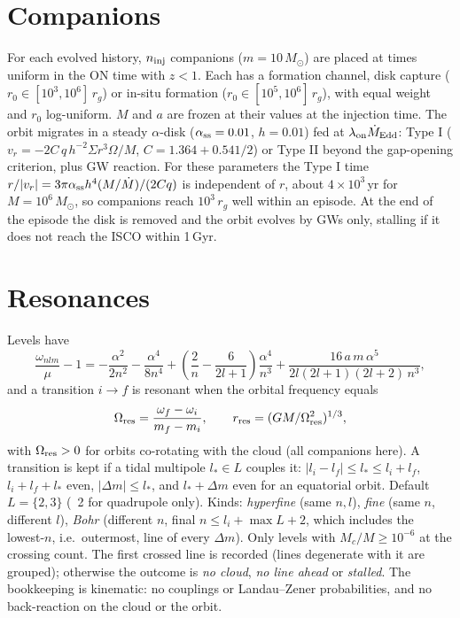 \documentclass[11pt]{article}
\newcommand{\code}[1]{\path{#1}}
\begin{document}
\section{Companions}
For each evolved history, $n_{\rm inj}$ companions ($m=10\,M_\odot$) are placed at times uniform in the ON time with $z<1$. Each has a formation channel, disk capture ($r_0\in[10^3,10^6]\,r_g$) or in-situ formation ($r_0\in[10^5,10^6]\,r_g$), with equal weight and $r_0$ log-uniform. $M$ and $a$ are frozen at their values at the injection time. The orbit migrates in a steady $\alpha$-disk ($\alpha_{\rm ss}=0.01$, $h=0.01$) fed at $\lambda_{\rm on}\dot M_{\rm Edd}$: Type I ($v_r=-2C\,q\,h^{-2}\Sigma r^3\Omega/M$, $C=1.364+0.541/2$) or Type II beyond the gap-opening criterion, plus GW reaction. For these parameters the Type I time $r/|v_r|=3\pi\alpha_{\rm ss}h^4(M/\dot M)/(2Cq)$ is independent of $r$, about $4\times10^3$\,yr for $M=10^6\,M_\odot$, so companions reach $10^3\,r_g$ well within an episode. At the end of the episode the disk is removed and the orbit evolves by GWs only, stalling if it does not reach the ISCO within 1\,Gyr.

\section{Resonances}
Levels have
\begin{equation}
\frac{\omega_{nlm}}{\mu}-1=-\frac{\alpha^2}{2n^2}-\frac{\alpha^4}{8n^4}+\left(\frac{2}{n}-\frac{6}{2l+1}\right)\frac{\alpha^4}{n^3}+\frac{16\,a\,m\,\alpha^5}{2l(2l+1)(2l+2)\,n^3},
\end{equation}
and a transition $i\to f$ is resonant when the orbital frequency equals
\begin{equation}
\Omega_{\rm res}=\frac{\omega_f-\omega_i}{m_f-m_i},\qquad r_{\rm res}=(GM/\Omega_{\rm res}^2)^{1/3},
\end{equation}
with $\Omega_{\rm res}>0$ for orbits co-rotating with the cloud (all companions here). A transition is kept if a tidal multipole $l_*\in L$ couples it: $|l_i-l_f|\le l_*\le l_i+l_f$, $l_i+l_f+l_*$ even, $|\Delta m|\le l_*$, and $l_*+\Delta m$ even for an equatorial orbit. Default $L=\{2,3\}$ (\code{--l_stars}~2 for quadrupole only). Kinds: \emph{hyperfine} (same $n,l$), \emph{fine} (same $n$, different $l$), \emph{Bohr} (different $n$, final $n\le l_i+\max L+2$, which includes the lowest-$n$, i.e.\ outermost, line of every $\Delta m$). Only levels with $M_c/M\ge10^{-6}$ at the crossing count. The first crossed line is recorded (lines degenerate with it are grouped); otherwise the outcome is \emph{no cloud}, \emph{no line ahead} or \emph{stalled}. The bookkeeping is kinematic: no couplings or Landau--Zener probabilities, and no back-reaction on the cloud or the orbit.
\end{document}
